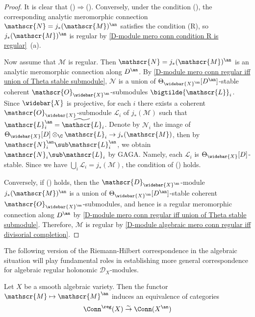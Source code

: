 \begin{proof}
It is clear that ()$\Rightarrow$(). Conversely, under the condition (), the corresponding analytic meromorphic connection $\mathscr{N}=j_*(\mathscr{M})^{\an}$ satisfies the condition (R), so $j_*(\mathscr{M})^{\an}$ is regular by \cref{D-module mero conn condition R is regular}~(a).\par
Now assume that $\mathscr{M}$ is regular. Then $\mathscr{N}=j_*(\mathscr{M})^{\an}$ is an analytic meromorphic connection along $D^{\an}$. By \cref{D-module mero conn regular iff union of Theta stable submodule}, $\mathscr{N}$ is a union of $\Theta_{\widebar{X}^{\an}}[D^{\an}]$-stable coherent $\mathscr{O}_{\widebar{X}^{\an}}$-submodules $\bigtilde{\mathscr{L}}_i$. Since $\widebar{X}$ is projective, for each $i$ there exists a coherent $\mathscr{O}_{\widebar{X}}$-submodule $\mathscr{L}_i$ of $j_*(\mathscr{M})$ such that $\mathscr{L}_i^{\an}=\widetilde{\mathscr{L}}_i$. Denote by $\mathscr{N}_i$ the image of $\Theta_{\widebar{X}}[D]\otimes_{\C}\mathscr{L}_i\to j_*(\mathscr{M})$, then by $\mathscr{N}_i^{\an}\sub\mathscr{L}_i^{\an}$, we obtain $\mathscr{N}_i\sub\mathscr{L}_i$ by GAGA. Namely, each $\mathscr{L}_i$ is $\Theta_{\widebar{X}}[D]$-stable. Since we have $\bigcup_i\mathscr{L}_i=j_*(\mathscr{M})$, the condition of () holds.\par
Conversely, if () holds, then the $\mathscr{D}_{\widebar{X}^{\an}}$-module $j_*(\mathscr{M})^{\an}$ is a union of $\Theta_{\widebar{X}^{\an}}[D^{\an}]$-stable coherent $\mathscr{O}_{\widebar{X}^{\an}}$-submodules, and hence is a regular meromorphic connection along $D^{\an}$ by \cref{D-module mero conn regular iff union of Theta stable submodule}. Therefore, $\mathscr{M}$ is regular by \cref{D-module algebraic mero conn regular iff divisorial completion}.
\end{proof}

The following version of the Riemann-Hilbert correspondence in the algebraic situation will play fundamental roles in establishing more general correspondence for algebraic regular holonomic $\mathscr{D}_X$-modules.

\begin{theorem}\label{D-module algebraic regular equivalence}
Let $X$ be a smooth algebraic variety. Then the functor $\mathscr{M}\mapsto\mathscr{M}^{\an}$ induces an equivalence of categories
\[\Conn^{\reg}(X)\stackrel{\sim}{\to} \Conn(X^{\an})\]

\end{theorem}

